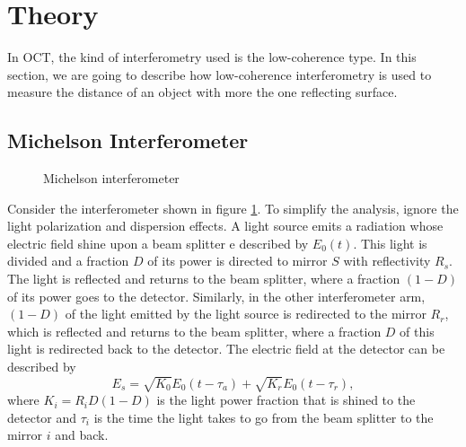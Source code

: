\documentclass[12pt,twoside,english]{book}
\renewcommand{\~}{\perispomeni}%
\numberwithin{equation}{section}
\numberwithin{figure}{section}
\begin{document}
\section{Theory}

In OCT, the kind of interferometry used is the low-coherence type. In this section, we are going to describe how low-coherence interferometry is used to measure the distance of an object with more the one reflecting surface.

\subsection{Michelson Interferometer}
\label{sub:Michelson interferometer}
%
\begin{figure}[h]
\center{}
\caption{Michelson interferometer\label{fig:Michelson-interferometer}}
\end{figure}
Consider the interferometer shown in figure \ref{fig:Michelson-interferometer}. To simplify the analysis, ignore the light polarization and dispersion effects. A light source emits a radiation whose electric field shine upon a beam splitter e described by $E_{0}\left(t\right)$. This light is divided and a fraction $D$ of its power is directed to mirror $S$ with reflectivity $R_{s}$. The light is reflected and returns to the beam splitter, where a fraction $\left(1-D\right)$ of its power goes to the detector. Similarly, in the other interferometer arm, $\left(1-D\right)$ of the light emitted by the light source is redirected to the mirror $R_{r}$, which is reflected and returns to the beam splitter, where a fraction $D$ of this light is redirected back to the detector. The electric field at the detector can be described by
\begin{equation}
E_{s}=\sqrt{K_{0}}E_{0}\left(t-\tau_{a}\right)+\sqrt{K_{r}}E_{0}\left(t-\tau_{r}\right),\label{eq:Simplest Field equation}
\end{equation}
where $K_{i}=R_{i}D\left(1-D\right)$ is the light power fraction that is shined to the detector and $\tau_{i}$ is the time the light takes to go from the beam splitter to the mirror $i$ and back.
\end{document}
